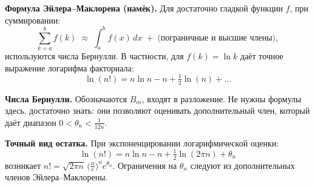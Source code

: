
\textbf{Формула Эйлера–Маклорена (намёк).}
Для достаточно гладкой функции $f$, при суммировании:
\[
\sum_{k=a}^{b} f(k)
\;\approx\;
\int_{a}^{b}f(x)\,dx \;+\; \text{(пограничные и высшие члены)},
\]
используются числа Бернулли. В частности, для $f(k)=\ln k$ даёт точное выражение логарифма факториала:
\[
\ln(n!)=n\ln n -n + \tfrac12\ln(n) + \dots
\]

\medskip

\textbf{Числа Бернулли.}
Обозначаются $B_{m}$, входят в разложение. Не нужны формулы здесь, достаточно знать: они позволяют оценивать дополнительный член, который даёт диапазон $0<\theta_n<\frac{1}{12n}$.

\medskip

\textbf{Точный вид остатка.}
При экспоненцировании логарифмической оценки:
\[
\ln(n!)=n\ln n -n + \tfrac12\ln(2\pi n)+\theta_n
\]
возникает $n! = \sqrt{2\pi n}\,\bigl(\tfrac{n}{e}\bigr)^n e^{\theta_n}$. Ограничения на $\theta_n$ следуют из дополнительных членов Эйлера–Маклорены.
